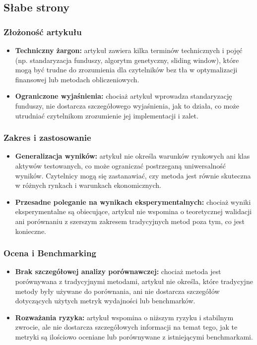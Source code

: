 \documentclass[polish,envcountsect,10pt]{article}
\begin{document}
\subsection{Słabe strony}

\subsubsection{Złożoność artykułu}

\begin{itemize}
	\item \textbf{Techniczny żargon:}
    artykuł zawiera kilka terminów technicznych i pojęć (np. standaryzacja funduszy, algorytm genetyczny, sliding window), które mogą być trudne do zrozumienia dla czytelników bez tła w optymalizacji finansowej lub metodach obliczeniowych.
	\item \textbf{Ograniczone wyjaśnienia:}
    chociaż artykuł wprowadza standaryzację funduszy, nie dostarcza szczegółowego wyjaśnienia, jak to działa, co może utrudniać czytelnikom zrozumienie jej implementacji i zalet.
\end{itemize}

\subsubsection{Zakres i zastosowanie}

\begin{itemize}
	\item \textbf{Generalizacja wyników:}
    artykuł nie określa warunków rynkowych ani klas aktywów testowanych, co może ograniczać postrzeganą uniwersalność wyników. Czytelnicy mogą się zastanawiać, czy metoda jest równie skuteczna w różnych rynkach i warunkach ekonomicznych.
	\item \textbf{Przesadne poleganie na wynikach eksperymentalnych:}
    chociaż wyniki eksperymentalne są obiecujące, artykuł nie wspomina o teoretycznej walidacji ani porównaniu z szerszym zakresem tradycyjnych metod poza tym, co jest konieczne.
\end{itemize}

\subsubsection{Ocena i Benchmarking}

\begin{itemize}
	\item \textbf{Brak szczegółowej analizy porównawczej:}
	chociaż metoda jest porównywana z tradycyjnymi metodami, artykuł nie określa, które tradycyjne metody były używane do porównania, ani nie dostarcza szczegółów dotyczących użytych metryk wydajności lub benchmarków.
	\item \textbf{Rozważania ryzyka:}
	artykuł wspomina o niższym ryzyku i stabilnym zwrocie, ale nie dostarcza szczegółowych informacji na temat tego, jak te metryki są ilościowo oceniane lub porównywane z istniejącymi benchmarkami.
\end{itemize}
\end{document}

